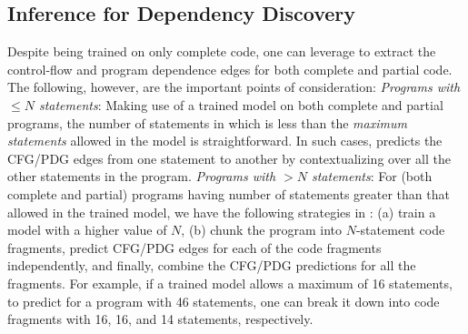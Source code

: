 \subsection{\bf Inference for Dependency Discovery}
\label{sec:inference}
Despite being trained on only complete code, one can leverage \tool to extract the control-flow and program dependence edges for both complete and partial code. The following, however, are the important points of consideration:
\textit{Programs with ${\leq}N$ statements}: Making use of a trained
\tool model on both complete and partial programs, the number of
statements in which is less than the \textit{maximum statements}
allowed in the model is straightforward. In such cases, \tool predicts
the CFG/PDG edges from one statement to another by contextualizing
over all the other statements in the program.
\textit{Programs with ${>}N$ statements}: For (both complete and
partial) programs having number of statements greater than that
allowed in the trained \tool model, we have the following strategies
in {\tool}: (a) train a model with a higher value of $N$, (b) chunk
the program into $N$-statement code fragments, predict CFG/PDG edges
for each of the code fragments independently, and finally, combine the
CFG/PDG predictions for all the fragments. For example, if a trained
model allows a maximum of 16 statements, to predict for a program with
46 statements, one can break it down into code fragments with 16, 16,
and 14 statements, respectively.



